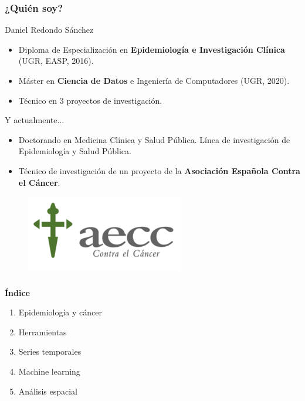 \documentclass{beamer}
\begin{document}
\begin{frame}\frametitle{¿Quién soy?}
	\begin{block}{Daniel Redondo Sánchez}		
				\begin{itemize}
					\item Diploma de Especialización en \textbf{Epidemiología e Investigación Clínica} (UGR, EASP, 2016).
					\item Máster en \textbf{Ciencia de Datos }e Ingeniería de Computadores (UGR, 2020).
					\item Técnico en 3 proyectos de investigación.
				\end{itemize}
				Y actualmente...
				\pause
				\begin{itemize}
					\item Doctorando en Medicina Clínica y Salud Pública. Línea de investigación de Epidemiología y Salud Pública.
					\item Técnico de investigación de un proyecto de la \textbf{Asociación Española Contra el Cáncer}.
				\end{itemize}
				\begin{figure}
					\centering
					\includegraphics[width=.2\textwidth]{logos/logo_aecc.png}
				\end{figure}
	\end{block}
\end{frame}


\begin{frame}\frametitle{}
	\Large{\textbf{Índice}}\\[2ex]
	\normalsize
	\begin{enumerate}
		\item Epidemiología y cáncer\\[2ex]
		\item Herramientas\\[2ex]
		\item Series temporales \\[2ex]
		\item Machine learning  \\[2ex]
		\item Análisis espacial \\[2ex]
	\end{enumerate}
\end{frame}
\end{document}
